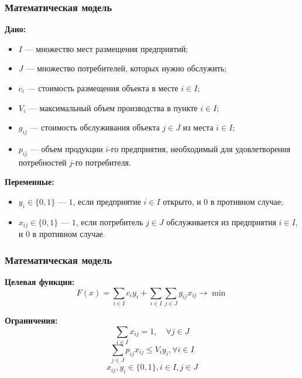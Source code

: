 \documentclass[12pt]{beamer}
\begin{document}
    \begin{frame}
        \frametitle{Математическая модель}
    
        \textbf{Дано:}
        \begin{itemize}
            \item $I$      --- множество мест размещения предприятий;
            \item $J$      --- множество потребителей, которых нужно обслужить;
            \item $c_i$    --- стоимость размещения объекта в месте $i \in I$;
            \item $V_{i}$  --- максимальный объем производства в пункте $i \in I$;
            \item $g_{ij}$ --- стоимость обслуживания объекта $j \in J$ из места $i \in I$;
            \item $p_{ij}$ --- объем продукции $i$-го предприятия, необходимый для удовлетворения потребностей $j$-го потребителя.
        \end{itemize}

        \textbf{Переменные:}
        \begin{itemize}
            \item $y_i \in \{0, 1\}$    --- $1$, если предприятие $i \in I$ открыто, и $0$ в противном случае;
            \item $x_{ij} \in \{0, 1\}$ --- $1$, если потребитель $j \in J$ обслуживается из предприятия $i \in I$, и $0$ в противном случае.
        \end{itemize}
    
    \end{frame}

    \begin{frame}
        \frametitle{Математическая модель}
    
        \textbf{Целевая функция:}
        \begin{equation}
            F(x) = \sum_{i \in I} c_i y_i + \sum_{i \in I} \sum_{j \in J} g_{ij} x_{ij} \to \min
        \end{equation}

        \textbf{Ограничения:}
        \begin{equation}
            \sum_{i \in I} x_{ij} = 1, \quad \forall j \in J
        \end{equation}
        \begin{equation}
            \sum_{j \in J} p_{ij} x_{ij} \leq V_{i} y_{i}, \forall i \in I
        \end{equation}
        \begin{equation}
            x_{ij}, y_i \in \{0, 1\}, i \in I, j \in J
        \end{equation}
    
    \end{frame}
\end{document}
